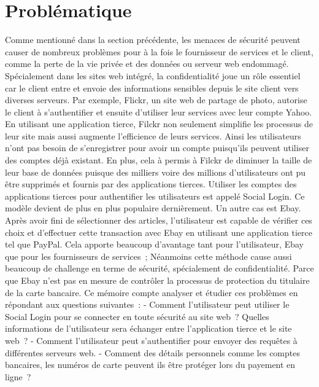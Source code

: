 \section{Problématique}
Comme mentionné dans la section précédente, les menaces de sécurité peuvent causer de nombreux problèmes pour à la fois le fournisseur de services et le client, comme la perte de la vie privée et des données ou  serveur web endommagé. Spécialement dans les sites web intégré, la confidentialité joue un rôle essentiel car le client entre et envoie des informations sensibles depuis le site client vers diverses serveurs. Par exemple, Flickr, un site web de partage de photo, autorise le client à s'authentifier et ensuite d'utiliser leur services avec leur compte Yahoo. En utilisant une application tierce, Filckr non seulement simplifie les processus de leur site mais aussi augmente l'efficience de leurs services. Ainsi les utilisateurs n'ont pas besoin de s'enregistrer pour avoir un compte puisqu'ils peuvent utiliser des comptes déjà existant. En plus, cela à permis à Filckr de diminuer la taille  de leur base de données puisque des milliers voire des millions d'utilisateurs ont pu être supprimés et fournis par des applications tierces. Utiliser les comptes des applications tierces pour authentifier  les utilisateurs est appelé Social Login. Ce modèle devient de plus en plus populaire dernièrement.
Un autre cas est Ebay. Après avoir fini de sélectionner des articles, l’utilisateur est capable de vérifier ces choix et d'effectuer cette transaction avec Ebay en utilisant une application tierce tel que PayPal. Cela apporte beaucoup d'avantage tant pour l'utilisateur, Ebay que pour les fournisseurs de services ; Néanmoins cette méthode cause aussi beaucoup de challenge en terme de sécurité, spécialement de confidentialité. Parce que Ebay n'est pas en mesure de contrôler la processus de protection du titulaire de la carte bancaire.
Ce mémoire compte analyser et étudier ces problèmes en répondant aux questions suivantes :
- Comment l’utilisateur peut utiliser le Social Login pour se connecter en toute sécurité au site web ? Quelles informations de l'utilisateur sera échanger entre l'application tierce et le site web ?
- Comment l'utilisateur peut s'authentifier pour envoyer des requêtes à différentes serveurs web.
- Comment des détails personnels comme les comptes bancaires, les numéros de carte peuvent ils être protéger lors du payement en ligne ?

